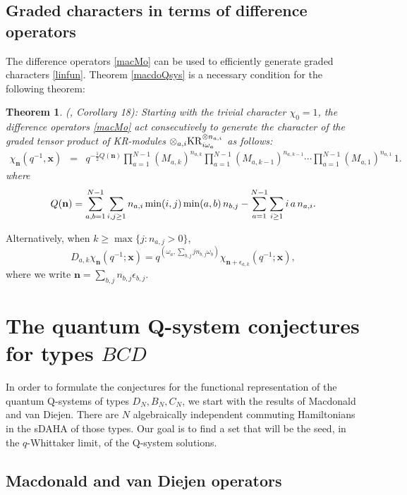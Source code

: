 \documentclass[12pt]{amsart}
\newtheorem{thm}{Theorem}[section]
\newcommand{\KR}{{{\rm KR}}}
\newcommand{\bn}{{\mathbf n}}
\newcommand{\bx}{{\mathbf x}}
\newcommand{\half}{\frac12}
\numberwithin{equation}{section}
\numberwithin{table}{section}
\begin{document}
\subsection{Graded characters in terms of difference operators}
The difference operators \eqref{macMo} can be used to efficiently generate graded characters \eqref{linfun}. Theorem \ref{macdoQsys} is a necessary condition for the following theorem:
\begin{thm} (\cite{DFK15}, Corollary 18):
Starting with the trivial character $\chi_0=1$, the difference operators \eqref{macMo} act consecutively to generate
the character of the graded tensor product of KR-modules 
$\otimes_{a,i} \KR_{i\omega_a}^{\otimes n_{a,i}}$ as follows: 
\begin{eqnarray}
\chi_\bn(q^{-1},\bx)&= & q^{-\half Q(\bn)}
 \prod_{a=1}^{N-1}(M_{a,k})^{n_{a,k}}\prod_{a=1}^{N-1}(M_{a,k-1})^{n_{a,k-1}}\cdots
\prod_{a=1}^{N-1}(M_{a,1})^{n_{a,1}}\, 1.
\end{eqnarray}
where
$$
Q(\bn) =  \sum_{a,b=1}^{N-1}\sum_{i,j\geq 1} n_{a,i}\, {\rm min}(i,j)\, {\rm min}(a,b)\, n_{b,j}-\sum_{a=1}^{N-1}\sum_{i\geq 1} i\, a\,  n_{a,i}.
$$
\end{thm}

Alternatively, when $k\geq \max\{j: n_{a,j}>0\}$, 
$$
D_{a,k} \chi_{\bn} (q^{-1};\bx) = q^{(\omega_a,\sum_{b,j} j n_{b,j}\omega_b)}\chi_{\bn+\epsilon_{a,k}}(q^{-1};\bx),
$$
where we write $\bn=\sum_{b,j} n_{b,j}\epsilon_{b,j}$.


\section{The quantum Q-system conjectures for types $BCD$} \label{sec:conj1}

In order to formulate the conjectures for the functional representation of the quantum Q-systems of types $D_N,B_N,C_N$, we start with the results
of Macdonald and van Diejen. There are $N$ algebraically independent commuting Hamiltonians in the sDAHA of those types. Our goal is to find a set that will be the seed, in the $q$-Whittaker limit, of the Q-system solutions.

\subsection{Macdonald and van Diejen operators}
\label{diff_ops}
\end{document}
